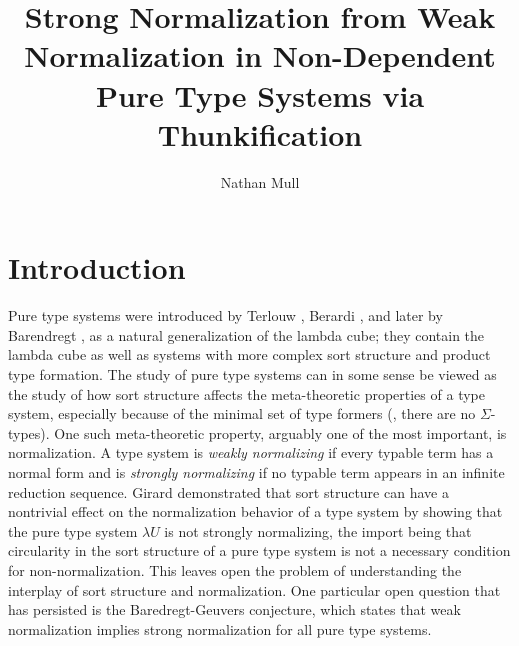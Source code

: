 \documentclass{article}
\title{Strong Normalization from Weak Normalization in Non-Dependent Pure Type Systems via Thunkification}
\author{Nathan Mull}
\begin{document}
\maketitle


\section{Introduction}

Pure type systems were introduced by Terlouw \cite{terlouw-1989}, Berardi \cite{berardi-1988}, and later by Barendregt \cite{barendregt-1991, barendregt-1993}, as a natural generalization of the lambda cube; they contain the lambda cube as well as systems with more complex sort structure and product type formation.
The study of pure type systems can in some sense be viewed as the study of how sort structure affects the meta-theoretic properties of a type system, especially because of the minimal set of type formers (\eg, there are no $\Sigma$-types).
One such meta-theoretic property, arguably one of the most important, is normalization.
A type system is \textit{weakly normalizing} if every typable term has a normal form and is \textit{strongly normalizing} if no typable term appears in an infinite reduction sequence.
Girard \cite{girard-1972} demonstrated that sort structure can have a nontrivial effect on the normalization behavior of a type system by showing that the pure type system $\lambda U$ is not strongly normalizing, the import being that circularity in the sort structure of a pure type system is not a necessary condition for non-normalization.
This leaves open the problem of understanding the interplay of sort structure and normalization.
One particular open question that has persisted is the Baredregt-Geuvers conjecture, which states that weak normalization implies strong normalization for all pure type systems.
\end{document}
